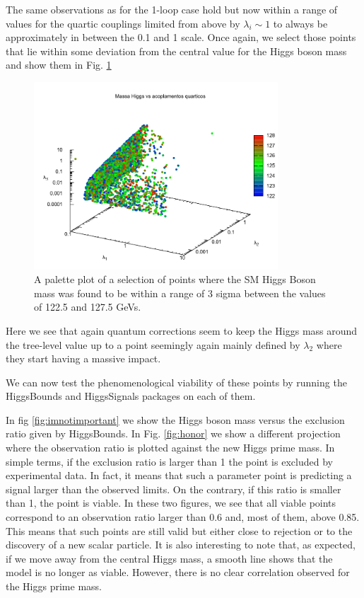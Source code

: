 \documentclass[12pt]{article}
\begin{document}
%
%
The same observations as for the 1-loop case hold but now within a range of values for the quartic couplings limited from above by $\lambda_i \sim 1$ to always be approximately in between the 0.1 and 1 scale. 
% 
Once again, we select those points that lie within some deviation from the central value for the Higgs boson mass and show them in Fig. \ref{gaiboi}
%
\begin{figure}[H]
\centering
  \includegraphics[width=\linewidth,height=7cm,keepaspectratio]{h1shape2loops.png}
  \caption{A palette plot of a selection of points where the SM Higgs Boson mass was found to be within a range of 3 sigma between the values of 122.5 and 127.5 GeVs.}
 \label{gaiboi}
\end{figure}
%
Here we see that again quantum corrections seem to keep the Higgs mass around the tree-level value up to a point seemingly again mainly defined by $\lambda_2$ where they start having a massive impact. 

We can now test the phenomenological viability of these points by running the HiggsBounds and HiggsSignals packages on each of them.

In fig \ref{fig:imnotimportant} we show the Higgs boson mass versus the exclusion ratio given by HiggsBounds. In Fig. \ref{fig:honor} we show a different projection where the observation ratio is plotted against the new Higgs prime mass. In simple terms, if the exclusion ratio is larger than 1 the point is excluded by experimental data. In fact, it means that such a parameter point is predicting a signal larger than the observed limits. On the contrary, if this ratio is smaller than 1, the point is viable. In these two figures, we see that all viable points correspond to an observation ratio larger than 0.6 and, most of them, above 0.85. This means that such points are still valid but either close to rejection or to the discovery of a new scalar particle. It is also interesting to note that, as expected, if we move away from the central Higgs mass, a smooth line shows that the model is no longer as viable. However, there is no clear correlation observed for the Higgs prime mass.
\end{document}
